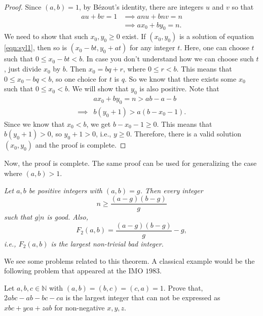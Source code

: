 \documentclass{subfile}
\begin{document}
	\begin{proof}
		Since $(a,b)=1$, by B\'{e}zout's identity, there are integers $u$ and $v$ so that
			\begin{align}
				au+bv = 1 & \implies anu+bnv = n\nonumber\\
				& \implies ax_0+by_0  = n.\label{eqn:syl1}
			\end{align} 
		We need to show that such $x_0,y_0 \geq 0$ exist. If $(x_0,y_0)$ is a solution of equation \eqref{eqn:syl1}, then so is $(x_0-bt,y_0+at)$ for any integer $t$. Here, one can choose $t$ such that $0 \leq x_0-bt<b$. In case you don't understand how we can choose such $t$, just divide $x_0$ by $b$. Then $x_0=bq+r$, where $0\leq r <b$. This means that $0 \leq x_0 -bq <b$, so one choice for $t$ is $q$. So we know that there exists some $x_0$ such that $0 \leq x_0<b$. We will show that $y_0$ is also positive. Note that
			\begin{align*}
				& ax_0+by_0 = n > ab-a-b\\
				\implies & b(y_0+1)  > a(b-x_0-1).
			\end{align*}
		Since we know that $x_0<b$, we get $b-x_0-1\geq 0$. This means that $b(y_0+1) >0$, so $y_0+1>0$, i.e., $y\geq0$. Therefore, there is a valid solution $(x_0,y_0)$ and the proof is complete.
	\end{proof}
Now, the proof is complete. The same proof can be used for generalizing the case where $(a,b)>1$.
	\begin{theorem}\slshape
		Let $a,b$ be positive integers with $(a,b)=g$. Then every integer \[n\geq\dfrac{(a-g)(b-g)}{g}\] such that $g|n$ is good. Also, \[F_2(a,b)=\dfrac{(a-g)(b-g)}{g}-g,\] i.e., $F_2(a,b)$ is the largest non-trivial bad integer.
	\end{theorem}

We see some problems related to this theorem. A classical example would be the following problem that appeared at the IMO $1983$.
	\begin{problem}[IMO 1983]
		Let $a,b,c\in\mathbb{N}$ with $(a,b)=(b,c)=(c,a)=1$. Prove that, $2abc-ab-bc-ca$ is the largest integer that can not be expressed as $xbc+yca+zab$ for non-negative $x,y,z$.
	\end{problem}
	
\end{document}
